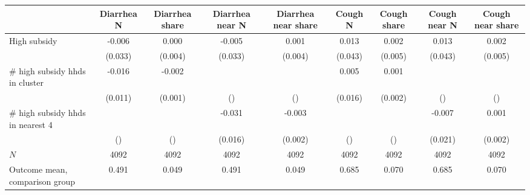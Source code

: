 \begin{tabular}{lcccccccc}
\hline\hline
 & Diarrhea N & Diarrhea share & Diarrhea near N & Diarrhea near share & Cough N & Cough share & Cough near N & Cough near share \\
\hline
High subsidy & -0.006 & 0.000 & -0.005 & 0.001 & 0.013 & 0.002 & 0.013 & 0.002 \\
 & (0.033) & (0.004) & (0.033) & (0.004) & (0.043) & (0.005) & (0.043) & (0.005) \\
# high subsidy hhds in cluster & -0.016 & -0.002 &  &  & 0.005 & 0.001 &  &  \\
 & (0.011) & (0.001) & () & () & (0.016) & (0.002) & () & () \\
# high subsidy hhds in nearest 4 &  &  & -0.031 & -0.003 &  &  & -0.007 & 0.001 \\
 & () & () & (0.016) & (0.002) & () & () & (0.021) & (0.002) \\
\hline
$N$ & 4092 & 4092 & 4092 & 4092 & 4092 & 4092 & 4092 & 4092 \\
Outcome mean, comparison group & 0.491 & 0.049 & 0.491 & 0.049 & 0.685 & 0.070 & 0.685 & 0.070 \\
\hline\hline
\end{tabular}
